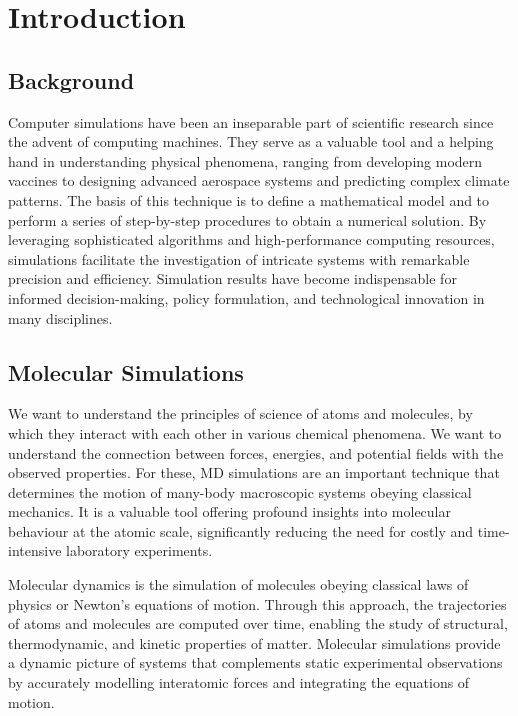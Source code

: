 \chapter{Introduction} %

\label{Chapter1}



\section{Background}
Computer simulations have been an inseparable part of scientific research since the advent of computing machines. They serve as a valuable tool and a helping hand in understanding physical phenomena, ranging from developing modern vaccines to designing advanced aerospace systems and predicting complex climate patterns. The basis of this technique is to define a mathematical model and to perform a series of step-by-step procedures to obtain a numerical solution. By leveraging sophisticated algorithms and high-performance computing resources, simulations facilitate the investigation of intricate systems with remarkable precision and efficiency. Simulation results have become indispensable for informed decision-making, policy formulation, and technological innovation in many disciplines.

\section{Molecular Simulations}
We want to understand the principles of science of atoms and molecules, by which they interact with each other in various chemical phenomena. We want to understand the connection between forces, energies, and potential fields with the observed properties. For these, \ac{MD} simulations are an important technique that determines the motion of many-body macroscopic systems obeying classical mechanics. It is a valuable tool offering profound insights into molecular behaviour at the atomic scale, significantly reducing the need for costly and time-intensive laboratory experiments.

Molecular dynamics is the simulation of molecules obeying classical laws of physics or Newton’s equations of motion. Through this approach, the trajectories of atoms and molecules are computed over time, enabling the study of structural, thermodynamic, and kinetic properties of matter. Molecular simulations provide a dynamic picture of systems that complements static experimental observations by accurately modelling interatomic forces and integrating the equations of motion.

